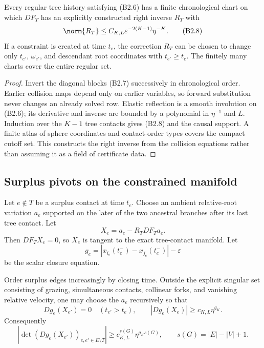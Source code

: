 \begin{proposition}
\label{prop:r31-b2-tree-right-inverse}
Every regular tree history satisfying (B2.6) has a finite chronological chart
on which $DF_T$ has an explicitly constructed right inverse $R_T$ with
\[
 \norm{R_T}\le C_{K,L}\varepsilon^{-2(K-1)}\eta^{-K}.     \tag{B2.8}
\]
If a constraint is created at time $t_e$, the correction $R_T$ can be chosen
to change only $t_{e'}$, $\omega_{e'}$, and descendant root coordinates with
$t_{e'}\ge t_e$.  The finitely many charts cover the entire regular set.
\end{proposition}

\begin{proof}
Invert the diagonal blocks (B2.7) successively in chronological order.
Earlier collision maps depend only on earlier variables, so forward
substitution never changes an already solved row.  Elastic reflection is a
smooth involution on (B2.6); its derivative and inverse are bounded by a
polynomial in $\eta^{-1}$ and $L$.  Induction over the $K-1$ tree contacts
gives (B2.8) and the causal support.  A finite atlas of sphere coordinates and
contact-order types covers the compact cutoff set.  This constructs the right
inverse from the collision equations rather than assuming it as a field of
certificate data.
\end{proof}

\subsection{Surplus pivots on the constrained manifold}

Let $e\notin T$ be a surplus contact at time $t_e$.  Choose an ambient
relative-root variation $a_e$ supported on the later of the two ancestral
branches after its last tree contact.  Let
\[
 X_e=a_e-R_TDF_Ta_e.                                      \tag{B2.9}
\]
Then $DF_TX_e=0$, so $X_e$ is tangent to the exact tree-contact manifold.
Let
\[
 g_e=|x_{i_e}(t_e^-)-x_{j_e}(t_e^-)|-\varepsilon          \tag{B2.10}
\]
be the scalar closure equation.

\begin{lemma}
\label{lem:r31-b2-pivot}
Order surplus edges increasingly by closing time.  Outside the explicit
singular set consisting of grazing, simultaneous contacts, collinear forks,
and vanishing relative velocity, one may choose the $a_e$ recursively so that
\[
 Dg_e(X_{e'})=0\quad(t_{e'}>t_e),\qquad
 |Dg_e(X_e)|\ge c_{K,L}\eta^{q_K}.                        \tag{B2.11}
\]
Consequently
\[
 \left|\det(Dg_e(X_{e'}))_{e,e'\in E\setminus T}\right|
 \ge c_{K,L}^{s(G)}\eta^{q_Ks(G)},\qquad
 s(G)=|E|-|V|+1.                                          \tag{B2.12}
\]
\end{lemma}

